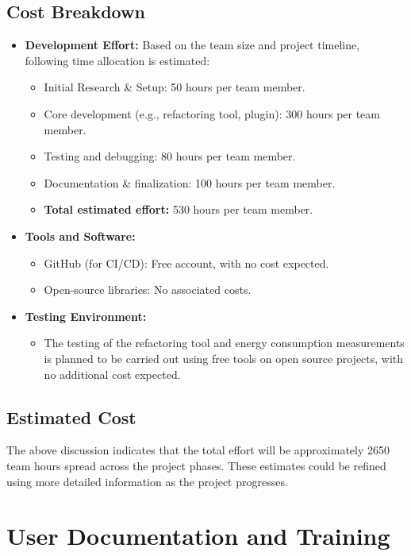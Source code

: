 \documentclass[12pt]{article}
\begin{document}
\subsection{Cost Breakdown}
\begin{itemize}
  \item \textbf{Development Effort:} Based on the team size and
    project timeline, following time allocation is estimated:
    \begin{itemize}
      \item Initial Research \& Setup: 50 hours per team member.
      \item Core development (e.g., refactoring tool, plugin): 300
        hours per team member.
      \item Testing and debugging: 80 hours per team member.
      \item Documentation \& finalization: 100 hours per team member.
      \item \textbf{Total estimated effort:} 530 hours per team member.
    \end{itemize}

  \item \textbf{Tools and Software:}
    \begin{itemize}
      \item GitHub (for CI/CD): Free account, with no cost expected.
      \item Open-source libraries: No associated costs.
    \end{itemize}

  \item \textbf{Testing Environment:}
    \begin{itemize}
      \item The testing of the refactoring tool and energy
        consumption measurements is planned to be carried out using
        free tools on open source projects, with no additional cost expected.
    \end{itemize}

\end{itemize}

\subsection{Estimated Cost}
The above discussion indicates that the total effort will be
approximately 2650 team hours spread across the project phases. These
estimates could be refined using more detailed information as the
project progresses.
\section{User Documentation and Training}
\end{document}
